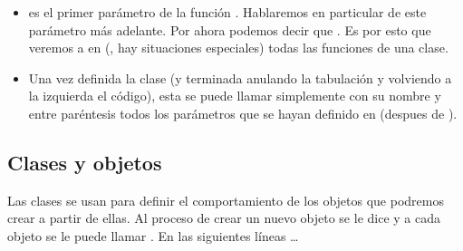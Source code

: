 \documentclass[a4paper,12pt,spanish]{sphinxmanual}
\begin{document}
\begin{itemize}
\item {} 
\sphinxAtStartPar
{} es el primer parámetro de la función . Hablaremos en particular de este
parámetro más adelante. Por ahora podemos decir que . Es
por esto que veremos a  en (, hay situaciones especiales) todas las funciones
de una clase.

\item {} 
\sphinxAtStartPar
Una vez definida la clase (y terminada anulando la tabulación y volviendo a la izquierda
el código), esta se puede llamar simplemente con su nombre y entre paréntesis todos los
parámetros que se hayan definido en  (despues de ).

\end{itemize}


\subsection{Clases y objetos}
\label{\detokenize{class:id1}}
\sphinxAtStartPar
Las clases se usan para definir el comportamiento de los objetos que podremos crear a partir
de ellas. Al proceso de crear un nuevo objeto se le dice  y a cada objeto se le
puede llamar .
En las siguientes líneas …

\begin{sphinxVerbatim}[commandchars=\\\{\}]
   
   
   
\end{sphinxVerbatim}
\end{document}
